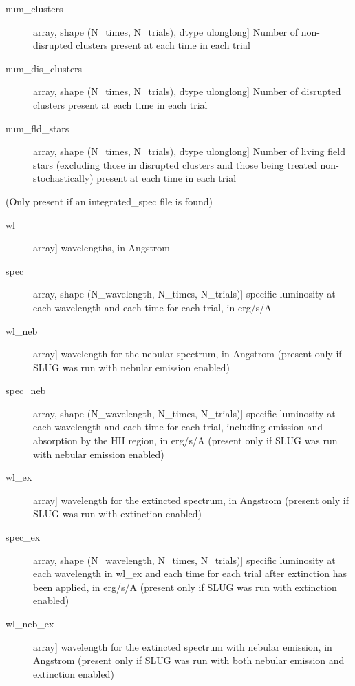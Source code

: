 \documentclass[letterpaper,10pt,english]{sphinxmanual}
\begin{document}
\begin{fulllineitems}
\begin{description}
\begin{description}
\item[{num\_clusters}] \leavevmode{[}array, shape (N\_times, N\_trials), dtype ulonglong{]}
Number of non-disrupted clusters present at each time in each
trial

\item[{num\_dis\_clusters}] \leavevmode{[}array, shape (N\_times, N\_trials), dtype ulonglong{]}
Number of disrupted clusters present at each time in each trial

\item[{num\_fld\_stars}] \leavevmode{[}array, shape (N\_times, N\_trials), dtype ulonglong{]}
Number of living field stars (excluding those in disrupted 
clusters and those being treated non-stochastically) present at
each time in each trial

\end{description}

(Only present if an integrated\_spec file is found)
\begin{description}
\item[{wl}] \leavevmode{[}array{]}
wavelengths, in Angstrom

\item[{spec}] \leavevmode{[}array, shape (N\_wavelength, N\_times, N\_trials){]}
specific luminosity at each wavelength and each time for each
trial, in erg/s/A

\item[{wl\_neb}] \leavevmode{[}array{]}
wavelength for the nebular spectrum, in Angstrom (present
only if SLUG was run with nebular emission enabled)

\item[{spec\_neb}] \leavevmode{[}array, shape (N\_wavelength, N\_times, N\_trials){]}
specific luminosity at each wavelength and each time for each
trial, including emission and absorption by the HII region,
in erg/s/A (present only if SLUG was run with nebular
emission enabled)

\item[{wl\_ex}] \leavevmode{[}array{]}
wavelength for the extincted spectrum, in Angstrom (present
only if SLUG was run with extinction enabled)

\item[{spec\_ex}] \leavevmode{[}array, shape (N\_wavelength, N\_times, N\_trials){]}
specific luminosity at each wavelength in wl\_ex and each
time for each trial after extinction has been applied, in
erg/s/A (present only if SLUG was run with extinction
enabled)

\item[{wl\_neb\_ex}] \leavevmode{[}array{]}
wavelength for the extincted spectrum with nebular emission,
in Angstrom (present only if SLUG was run with both nebular
emission and extinction enabled)


\end{description}
\end{description}
\end{fulllineitems}
\end{document}
